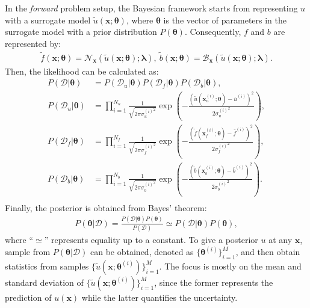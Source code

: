 \documentclass[conference,compsoc]{IEEEtran}
\begin{document}
In the {\em forward} problem setup, the Bayesian framework starts from representing $u$ with a surrogate model $\tilde{u}(\boldsymbol{x}; \boldsymbol{\theta})$, where $\boldsymbol{\theta}$ is the vector of parameters in the surrogate model with a prior distribution $P(\boldsymbol{\theta})$. Consequently, $f$ and $b$ are represented by: 
\begin{equation}
\label{eqn:fb}
\begin{aligned}
    \tilde{f}(\boldsymbol{x}; \boldsymbol{\theta}) = \mathcal{N}_{\boldsymbol{x}}(\tilde{u}(\boldsymbol{x}; \boldsymbol{\theta});\boldsymbol{\lambda}), ~\tilde{b}(\boldsymbol{x}; \boldsymbol{\theta}) = \mathcal{B}_{\boldsymbol{x}}(\tilde{u}(\boldsymbol{x}; \boldsymbol{\theta}) ;\boldsymbol{\lambda}).
\end{aligned}
\end{equation}
\newline
Then, the likelihood can be calculated as:
\begin{equation}
\label{eqn:likelihood}
\begin{aligned}
    P(\mathcal{D}|\boldsymbol{\theta}) &= P(\mathcal{D}_u|\boldsymbol{\theta}) P(\mathcal{D}_f|\boldsymbol{\theta}) P(\mathcal{D}_b|\boldsymbol{\theta}), \\
     P(\mathcal{D}_u|\boldsymbol{\theta}) &= \prod_{i=1}^{N_u} \frac{1}{\sqrt{2\pi{\sigma_u^{(i)}}^2}}\exp \left(-\frac{(\tilde{u}(\boldsymbol{x}_{u}^{(i)}; \boldsymbol{\theta}) - \bar{u}^{(i)})^2}{2{\sigma_u^{(i)}}^2}\right), \\
     P(\mathcal{D}_f|\boldsymbol{\theta}) &= \prod_{i=1}^{N_f} \frac{1}{\sqrt{2\pi{\sigma_f^{(i)}}^2}}\exp \left(-\frac{(\tilde{f}(\boldsymbol{x}_{f}^{(i)}; \boldsymbol{\theta}) - \bar{f}^{(i)})^2}{2{\sigma_f^{(i)}}^2}\right), \\
    P(\mathcal{D}_b|\boldsymbol{\theta}) &= \prod_{i=1}^{N_b} \frac{1}{\sqrt{2\pi{\sigma_b^{(i)}}^2}}\exp \left(-\frac{(\tilde{b}(\boldsymbol{x}_{b}^{(i)}; \boldsymbol{\theta}) - \bar{b}^{(i)})^2}{2{\sigma_b^{(i)}}^2}\right). \\
\end{aligned}
\end{equation}
Finally, the posterior is obtained from Bayes' theorem:
\begin{equation}
\label{eqn:forwardpost}
\begin{aligned}
P(\boldsymbol{\theta}| \mathcal{D}) = \frac{ P(\mathcal{D}|\boldsymbol{\theta})P(\boldsymbol{\theta})}{P(\mathcal{D})} \simeq P(\mathcal{D}|\boldsymbol{\theta})P(\boldsymbol{\theta}),
\end{aligned}
\end{equation}
where ``$\simeq$'' represents equality up to a constant. To give a posterior $u$ at any $\boldsymbol{x}$, sample from $P(\boldsymbol{\theta}| \mathcal{D})$ can be obtained, denoted as $\{{\boldsymbol{\theta}}^{(i)}\}_{i=1}^M$, and then obtain statistics from samples $\{\tilde{u}(\boldsymbol{x}; {\boldsymbol{\theta}}^{(i)} ) \}_{i=1}^M$. The focus is mostly on the mean and standard deviation of $\{\tilde{u}(\boldsymbol{x}; {\boldsymbol{\theta}}^{(i)} ) \}_{i=1}^M$, since the former represents the prediction of  $u(\boldsymbol{x})$ while the latter quantifies the uncertainty.
\end{document}
